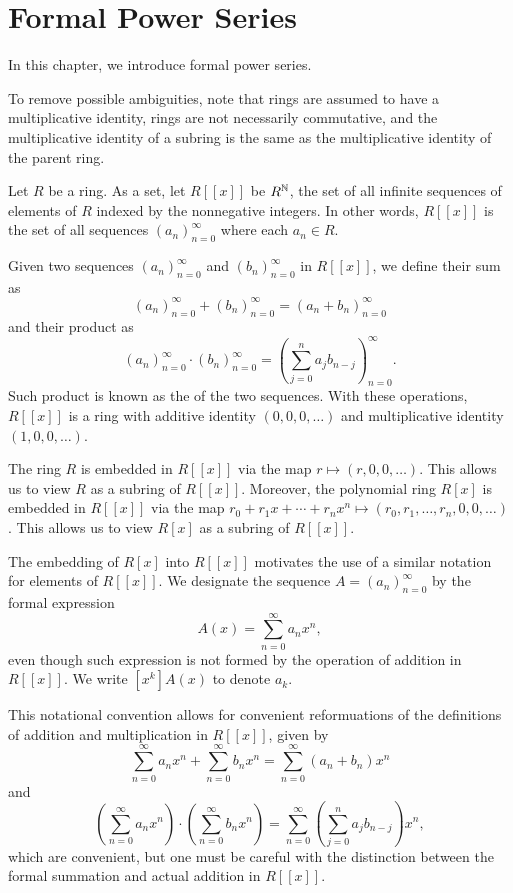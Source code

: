 \chapter{Formal Power Series}

In this chapter, we introduce formal power series.

To remove possible ambiguities, 
note that
rings are assumed to have a multiplicative identity,
rings are not necessarily commutative, and
the multiplicative identity of a subring is the same as the multiplicative identity of the parent ring.

Let \(R\) be a ring.
As a set, let \(R[[x]]\) be \(R^{\mathbb{N}}\), the set of all infinite sequences of elements of \(R\) indexed by the nonnegative integers.
In other words, \(R[[x]]\) is the set of all sequences \((a_n)_{n=0}^\infty\) where each \(a_n \in R\).

Given two sequences \((a_n)_{n=0}^\infty\) and \((b_n)_{n=0}^\infty\) in \(R[[x]]\), we define their sum as
\[
    (a_n)_{n=0}^\infty + (b_n)_{n=0}^\infty = (a_n + b_n)_{n=0}^\infty
\]
and their product as
\[
    (a_n)_{n=0}^\infty \cdot (b_n)_{n=0}^\infty = \left( \sum_{j=0}^n a_j b_{n-j} \right)_{n=0}^\infty.
\]
Such product is known as the  of the two sequences.
With these operations, \(R[[x]]\) is a ring with additive identity \((0, 0, 0, \dots)\) and multiplicative identity \((1, 0, 0, \dots)\).

The ring \(R\) is embedded in \(R[[x]]\) via the map \(r \mapsto (r, 0, 0, \dots)\).
This allows us to view \(R\) as a subring of \(R[[x]]\).
Moreover, the polynomial ring \(R[x]\) is embedded in \(R[[x]]\) via the map \(r_0 + r_1 x + \cdots + r_n x^n \mapsto (r_0, r_1, \dots, r_n, 0, 0, \dots)\).
This allows us to view \(R[x]\) as a subring of \(R[[x]]\).

The embedding of \(R[x]\) into \(R[[x]]\) motivates the use of a similar notation for elements of \(R[[x]]\).
We designate the sequence \(A = (a_n)_{n=0}^\infty\) by the formal expression
\begin{equation*}
    A(x) = \sum_{n=0}^\infty a_n x^n,
\end{equation*}
even though such expression is not formed by the operation of addition in \(R[[x]]\).
We write \([x^k]A(x)\) to denote \(a_k\).

This notational convention allows for convenient reformuations of the definitions of addition and multiplication in \(R[[x]]\), given by
\begin{equation*}
    \sum_{n=0}^\infty a_n x^n + \sum_{n=0}^\infty b_n x^n = \sum_{n=0}^\infty (a_n + b_n) x^n
\end{equation*}
and
\begin{equation*}
    \left( \sum_{n=0}^\infty a_n x^n \right) \cdot \left( \sum_{n=0}^\infty b_n x^n \right) = \sum_{n=0}^\infty \left( \sum_{j=0}^n a_j b_{n-j} \right) x^n,
\end{equation*}
which are convenient, but one must be careful with the distinction between the formal summation and actual addition in \(R[[x]]\).

